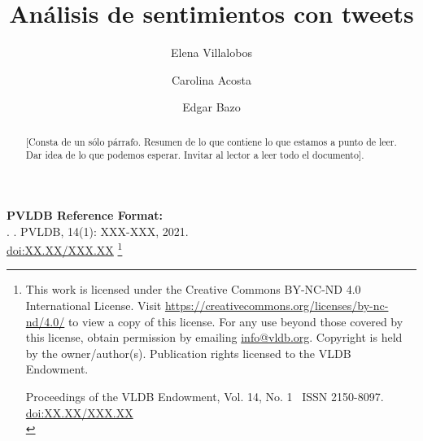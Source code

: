 \documentclass[sigconf, nonacm, spanish]{acmart}
\newcommand\vldbdoi{XX.XX/XXX.XX}
\newcommand\vldbpages{XXX-XXX}
\newcommand\vldbvolume{14}
\newcommand\vldbissue{1}
\newcommand\vldbyear{2021}
\newcommand\vldbauthors{\authors}
\newcommand\vldbtitle{\shorttitle}
\newcommand\vldbpagestyle{plain}
\begin{document}
\title{Análisis de sentimientos con tweets}

\author{Elena Villalobos}

\author{Carolina Acosta}

\author{Edgar Bazo}


\begin{abstract}

[Consta de un sólo párrafo.
Resumen de lo que contiene lo que estamos a punto de leer.
Dar idea de lo que podemos esperar.
Invitar al lector a leer todo el documento].
\end{abstract}

\maketitle

\pagestyle{\vldbpagestyle}
\begingroup\small\noindent\raggedright\textbf{PVLDB Reference Format:}\\
\vldbauthors. \vldbtitle. PVLDB, \vldbvolume(\vldbissue): \vldbpages, \vldbyear.\\
\href{https://doi.org/\vldbdoi}{doi:\vldbdoi}
\endgroup
\begingroup
\renewcommand\thefootnote{}\footnote{\noindent
This work is licensed under the Creative Commons BY-NC-ND 4.0 International License. Visit \url{https://creativecommons.org/licenses/by-nc-nd/4.0/} to view a copy of this license. For any use beyond those covered by this license, obtain permission by emailing \href{mailto:info@vldb.org}{info@vldb.org}. Copyright is held by the owner/author(s). Publication rights licensed to the VLDB Endowment. \\
\raggedright Proceedings of the VLDB Endowment, Vol. \vldbvolume, No. \vldbissue\ %
ISSN 2150-8097. \\
\href{https://doi.org/\vldbdoi}{doi:\vldbdoi} \\
}\addtocounter{footnote}{-1}\endgroup
\end{document}
